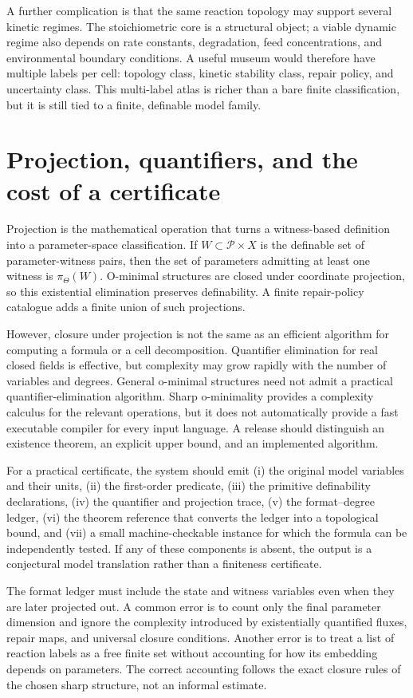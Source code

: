\documentclass[11pt,a4paper]{article}
\theoremstyle{definition}
\theoremstyle{remark}
\newcommand{\ThetaSet}{\mathcal{P}}
\begin{document}
A further complication is that the same reaction topology may support several kinetic regimes. The stoichiometric core is a structural object; a viable dynamic regime also depends on rate constants, degradation, feed concentrations, and environmental boundary conditions. A useful museum would therefore have multiple labels per cell: topology class, kinetic stability class, repair policy, and uncertainty class. This multi-label atlas is richer than a bare finite classification, but it is still tied to a finite, definable model family.

\section{Projection, quantifiers, and the cost of a certificate}
Projection is the mathematical operation that turns a witness-based definition into a parameter-space classification. If \(W\subset\ThetaSet\times X\) is the definable set of parameter-witness pairs, then the set of parameters admitting at least one witness is \(\pi_\Theta(W)\). O-minimal structures are closed under coordinate projection, so this existential elimination preserves definability. A finite repair-policy catalogue adds a finite union of such projections.

However, closure under projection is not the same as an efficient algorithm for computing a formula or a cell decomposition. Quantifier elimination for real closed fields is effective, but complexity may grow rapidly with the number of variables and degrees. General o-minimal structures need not admit a practical quantifier-elimination algorithm. Sharp o-minimality provides a complexity calculus for the relevant operations, but it does not automatically provide a fast executable compiler for every input language. A release should distinguish an existence theorem, an explicit upper bound, and an implemented algorithm.

For a practical certificate, the system should emit (i) the original model variables and their units, (ii) the first-order predicate, (iii) the primitive definability declarations, (iv) the quantifier and projection trace, (v) the format--degree ledger, (vi) the theorem reference that converts the ledger into a topological bound, and (vii) a small machine-checkable instance for which the formula can be independently tested. If any of these components is absent, the output is a conjectural model translation rather than a finiteness certificate.

The format ledger must include the state and witness variables even when they are later projected out. A common error is to count only the final parameter dimension and ignore the complexity introduced by existentially quantified fluxes, repair maps, and universal closure conditions. Another error is to treat a list of reaction labels as a free finite set without accounting for how its embedding depends on parameters. The correct accounting follows the exact closure rules of the chosen sharp structure, not an informal estimate.
\end{document}
